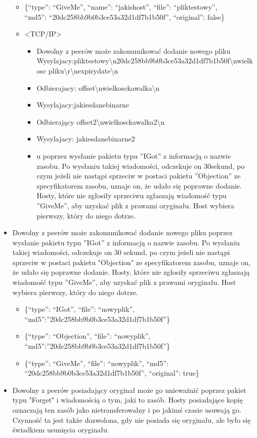 \documentclass[10pt,a4paper]{article}
\begin{document}
\begin{itemize}
\begin{itemize}
\item \{“type”: “GiveMe”, “name”: “jakishost”, “file”: “pliktestowy”, 
\\“md5”: “20dc258bb9b0b3ce53a32d1df7b1b50f”, “original”: false\}
\item <TCP/IP>
\begin{itemize}
\renewcommand{\labelitemiii}{$\circ$}
\item Dowolny z peerów może zakomunikować dodanie nowego pliku
\\Wysylajacy:pliktestowy\textbackslash n20dc258bb9b0b3ce53a32d1df7b1b50f\textbackslash nwielkosc pliku\textbackslash r\textbackslash nexpirydate\textbackslash n
\item Odbierajacy: offset\textbackslash nwielkosckawalka\textbackslash n
\item Wysylajacy:jakiesdanebinarne
\item Odbierający offset2\textbackslash nwielkosckawalka2\textbackslash n
\item Wysylajacy: jakiesdanebinarne2 
\item u poprzez wysłanie pakietu typu ''IGot'' z informacją o nazwie zasobu. Po wysłaniu takiej wiadomości, odczekuje on 30sekund, po czym jeżeli nie nastąpi sprzeciw w postaci pakietu ''Objection'' ze specyfikatorem zasobu, uznaje on, że udało się poprawne dodanie. Hosty, które nie zgłosiły sprzeciwu zgłaszają wiadomość typu ''GiveMe'', aby uzyskać plik z prawami oryginału. Host wybiera pierwszy, który do niego dotrze.
\end{itemize}
\end{itemize}
\item Dowolny z peerów może zakomunikować dodanie nowego pliku poprzez wysłanie pakietu typu ''IGot'' z informacją o nazwie zasobu. Po wysłaniu takiej wiadomości, odczekuje on 30 sekund, po czym jeżeli nie nastąpi sprzeciw w postaci pakietu "Objection" ze specyfikatorem zasobu, uznaje on, że udało się poprawne dodanie. Hosty, które nie zgłosiły sprzeciwu zgłaszają wiadomość typu ''GiveMe'', aby uzyskać plik z prawami oryginału. Host wybiera pierwszy, który do niego dotrze.
\begin{itemize}
\item \{“type”: “IGot”, “file”: “nowyplik”, “md5”:”20dc258bb9b0b3ce53a32d1df7b1b50f”\}
\item \{“type”: “Objection”, “file”: “nowyplik”, “md5”:”20dc258bb9b0b3ce53a32d1df7b1b50f”\}
\item \{“type”: “GiveMe”, “file”: “nowyplik”, “md5”: “20dc258bb9b0b3ce53a32d1df7b1b50f”, “original”: true\}
\end{itemize}
\item Dowolny z peerów posiadający oryginał może go unieważnić poprzez pakiet typu "Forget" i wiadomością o tym, jaki to zasób. Hosty posiadające kopię oznaczają ten zasób jako nietransferowalny i po jakimś czasie usuwają
go. Czynność ta jest także dozwolona, gdy nie posiada się oryginału, 
ale było się świadkiem usunięcia oryginału.


\end{itemize}
\end{document}
